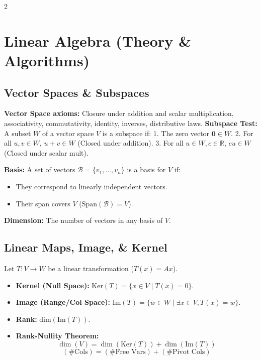 \documentclass[10pt, letterpaper]{article}
\begin{document}
\small
\begin{multicols*}{2}

\section{Linear Algebra (Theory \& Algorithms)}

\subsection{Vector Spaces \& Subspaces}
\textbf{Vector Space axioms:} Closure under addition and scalar multiplication, associativity, commutativity, identity, inverses, distributive laws.
\textbf{Subspace Test:} A subset $W$ of a vector space $V$ is a subspace if:
1. The zero vector $\mathbf{0} \in W$.
2. For all $u, v \in W$, $u+v \in W$ (Closed under addition).
3. For all $u \in W, c \in \mathbb{R}$, $cu \in W$ (Closed under scalar mult).

\textbf{Basis:} A set of vectors $\mathcal{B} = \{v_1, \dots, v_n\}$ is a basis for $V$ if:
\begin{itemize}
    \item They correspond to linearly independent vectors.
    \item Their span covers $V$ ($\text{Span}(\mathcal{B}) = V$).
\end{itemize}
\textbf{Dimension:} The number of vectors in any basis of $V$.

\subsection{Linear Maps, Image, \& Kernel}
Let $T: V \to W$ be a linear transformation ($T(x) = Ax$).
\begin{itemize}
    \item \textbf{Kernel (Null Space):} $\text{Ker}(T) = \{x \in V \mid T(x) = 0\}$.
    \item \textbf{Image (Range/Col Space):} $\text{Im}(T) = \{w \in W \mid \exists x \in V, T(x) = w\}$.
    \item \textbf{Rank:} $\text{dim}(\text{Im}(T))$.
    \item \textbf{Rank-Nullity Theorem:} 
    $$ \dim(V) = \dim(\text{Ker}(T)) + \dim(\text{Im}(T)) $$
    $$ (\text{\# Cols}) = (\text{\# Free Vars}) + (\text{\# Pivot Cols}) $$
\end{itemize}


\end{multicols*}
\end{document}
